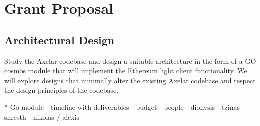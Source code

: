 \section{Grant Proposal}
\subsection{Architectural Design}
Study the Axelar codebase and design a suitable architecture in the form of a GO cosmos module that will implement the Ethereum light client functionality. 
We will explore designs that minimally alter the existing Axelar codebase and respect the design principles of the codebase. 


* Go module 
- timeline with deliverables 
    - budget 
    - people 
        - dionysis
        - tzinas
        - shresth
        - nikolas / alexis

